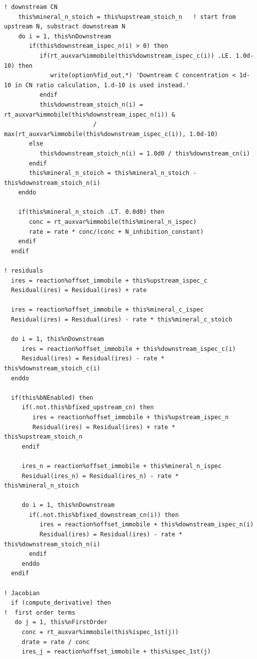 \documentclass[12pt, a4paper]{article}
\begin{document}
\begin{verbatim}
! downstream CN
    this%mineral_n_stoich = this%upstream_stoich_n   ! start from upstream N, substract downstream N
    do i = 1, this%nDownstream
       if(this%downstream_ispec_n(i) > 0) then
          if(rt_auxvar%immobile(this%downstream_ispec_c(i)) .LE. 1.0d-10) then
             write(option%fid_out,*) 'Downtream C concentration < 1d-10 in CN ratio calculation, 1.d-10 is used instead.'
          endif 
          this%downstream_stoich_n(i) = rt_auxvar%immobile(this%downstream_ispec_n(i)) & 
                         / max(rt_auxvar%immobile(this%downstream_ispec_c(i)), 1.0d-10)
       else
          this%downstream_stoich_n(i) = 1.0d0 / this%downstream_cn(i)
       endif
       this%mineral_n_stoich = this%mineral_n_stoich - this%downstream_stoich_n(i)
    enddo         

    if(this%mineral_n_stoich .LT. 0.0d0) then
       conc = rt_auxvar%immobile(this%mineral_n_ispec)  
       rate = rate * conc/(conc + N_inhibition_constant)  
    endif
  endif

! residuals
  ires = reaction%offset_immobile + this%upstream_ispec_c      
  Residual(ires) = Residual(ires) + rate       

  ires = reaction%offset_immobile + this%mineral_c_ispec      
  Residual(ires) = Residual(ires) - rate * this%mineral_c_stoich      

  do i = 1, this%nDownstream
     ires = reaction%offset_immobile + this%downstream_ispec_c(i)      
     Residual(ires) = Residual(ires) - rate * this%downstream_stoich_c(i)      
  enddo 

  if(this%bNEnabled) then
     if(.not.this%bfixed_upstream_cn) then
        ires = reaction%offset_immobile + this%upstream_ispec_n      
        Residual(ires) = Residual(ires) + rate * this%upstream_stoich_n      
     endif

     ires_n = reaction%offset_immobile + this%mineral_n_ispec      
     Residual(ires_n) = Residual(ires_n) - rate * this%mineral_n_stoich      

     do i = 1, this%nDownstream
       if(.not.this%bfixed_downstream_cn(i)) then
          ires = reaction%offset_immobile + this%downstream_ispec_n(i)      
          Residual(ires) = Residual(ires) - rate * this%downstream_stoich_n(i)      
       endif
     enddo 
  endif

! Jacobian
  if (compute_derivative) then
!  first order terms
   do j = 1, this%nFirstOrder
     conc = rt_auxvar%immobile(this%ispec_1st(j))  
     drate = rate / conc 
     ires_j = reaction%offset_immobile + this%ispec_1st(j) 


\end{verbatim}
\end{document}

